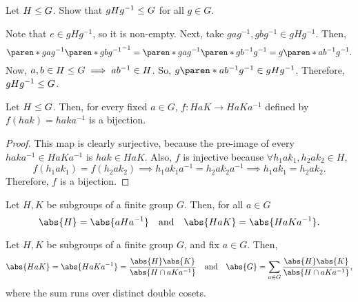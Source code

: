 \documentclass[11pt]{penrose}
\begin{document}
\begin{nex}
    Let $H \mathrel{\leq} G$. Show that $gHg^{-1} \mathrel{\leq} G$ for all $g \in G$.

    Note that $e \in gHg^{-1}$, so it is non-empty. Next, take $gag^{-1}, gbg^{-1} \in gHg^{-1}$. Then,
    \begin{equation*}
        \paren*{gag^{-1}} \paren*{gbg^{-1}}^{-1} = \paren*{gag^{-1}} \paren*{gb^{-1}g^{-1}} = g \paren*{ab^{-1}} g^{-1}.
    \end{equation*}
    Now, $a, b \in H \mathrel{\leq} G \implies ab^{-1} \in H$. So, $g \paren*{ab^{-1}} g^{-1} \in gHg^{-1}$. Therefore, $gHg^{-1} \mathrel{\leq} G$.
\end{nex}

\begin{nlemma}
    Let $H \mathrel{\leq} G$. Then, for every fixed $a \in G$, $f : HaK \to H a K a^{-1}$ defined by $f(hak) = haka^{-1}$ is a bijection.
\end{nlemma}
\begin{proof}
    This map is clearly surjective, because the pre-image of every $haka^{-1} \in HaKa^{-1}$ is $hak \in HaK$. Also, $f$ is injective because $\forall h_{1}ak_{1}, h_{2}ak_{2} \in H$,
    \begin{equation*}
        f(h_{1}ak_{1}) = f(h_{2}ak_{2}) \implies h_{1}ak_{1}a^{-1} = h_{2}ak_{2}a^{-1} \implies h_{1}ak_{1} = h_{2}ak_{2}.
    \end{equation*}
    Therefore, $f$ is a bijection.
\end{proof}

\begin{ncor}
    Let $H, K$ be subgroups of a finite group $G$. Then, for all $a \in G$
    \begin{equation*}
        \abs{H} = \abs{aHa^{-1}}
        \quad\text{and}\quad
        \abs{HaK} = \abs{HaKa^{-1}}.
    \end{equation*}
\end{ncor}

\begin{remark}
    Let $H, K$ be subgroups of a finite group $G$, and fix $a \in G$. Then,
    \begin{equation*}
        \abs{HaK} = \abs{HaKa^{-1}} = \frac{\abs{H}\abs{K}}{\abs{H \cap aKa^{-1}}}
        \quad\text{and}\quad
        \abs{G} = \sum_{a \in G} \frac{\abs{H}\abs{K}}{\abs{H \cap aKa^{-1}}},
    \end{equation*}
    where the sum runs over distinct double cosets.
\end{remark}
\end{document}
